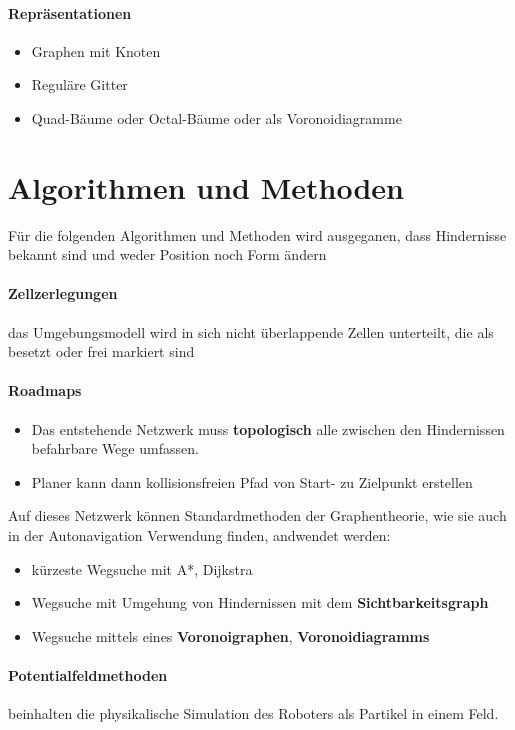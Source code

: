 \paragraph{Repräsentationen}
\begin{itemize}
	\item Graphen mit Knoten
	\item Reguläre Gitter
	\item Quad-Bäume oder Octal-Bäume oder als Voronoidiagramme
\end{itemize}
\section{Algorithmen und Methoden}
Für die folgenden Algorithmen und Methoden wird ausgeganen, dass Hindernisse bekannt sind und weder Position noch Form ändern
\paragraph{Zellzerlegungen} das Umgebungsmodell wird in sich nicht überlappende Zellen unterteilt, die als besetzt oder frei markiert sind
\paragraph{Roadmaps}
\begin{itemize}
	\item Das entstehende Netzwerk muss \textbf{topologisch} alle zwischen den Hindernissen befahrbare Wege umfassen.
	\item Planer kann dann kollisionsfreien Pfad von Start- zu Zielpunkt erstellen
\end{itemize}
Auf dieses Netzwerk können Standardmethoden der Graphentheorie, wie sie auch in der Autonavigation Verwendung finden, andwendet werden:
\begin{itemize}
	\item kürzeste Wegsuche mit A*, Dijkstra
	\item Wegsuche mit Umgehung von Hindernissen mit dem \textbf{Sichtbarkeitsgraph}
	\item Wegsuche mittels eines \textbf{Voronoigraphen}, \textbf{Voronoidiagramms}
\end{itemize}
\paragraph{Potentialfeldmethoden} beinhalten die physikalische Simulation des Roboters als Partikel in einem Feld.
\newpage
